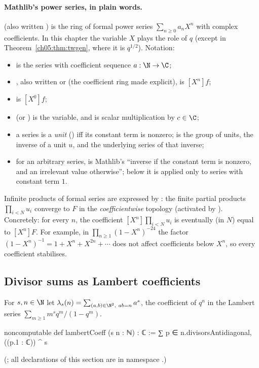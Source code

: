 \paragraph{Mathlib's power series, in plain words.}
 (also written ) is the ring of formal power series $\sum_{n\ge0}a_nX^n$
with complex coefficients. In this chapter the variable $X$ plays the role of $q$ (except in
Theorem~\ref{ch05:thm:twgen}, where it is $q^{1/2}$). Notation:
\begin{itemize}
  \item {} is the series with coefficient sequence $a:\N\to\C$;
  \item {}, also written  or
     (the coefficient ring made explicit), is $[X^n]f$;
  \item {} is $[X^0]f$;
  \item {} (or ) is the variable, and  is scalar
    multiplication by $c\in\C$;
  \item a series is a \emph{unit} () iff its constant term is nonzero;
     is the group of units,  the inverse of a unit $u$, and
     the underlying series of that inverse;
  \item for an arbitrary series,  is Mathlib's ``inverse if the constant term is nonzero,
    and an irrelevant value otherwise''; below it is applied only to series with constant term $1$.
\end{itemize}
Infinite products of formal series are expressed by : the finite partial
products $\prod_{i<N}u_i$ converge to $F$ in the \emph{coefficientwise} topology (activated by
). Concretely: for every $n$, the coefficient
$[X^n]\prod_{i<N}u_i$ is eventually (in $N$) equal to $[X^n]F$. For example, in
$\prod_{n\ge1}(1-X^n)^{-24}$ the factor $(1-X^n)^{-1} = 1 + X^n + X^{2n}+\cdots$ does not affect
coefficients below $X^n$, so every coefficient stabilises.

\subsection{Divisor sums as Lambert coefficients}

\begin{definition}\label{ch05:def:lambert}
For $s,n\in\N$ let $\lambda_s(n) = \sum_{(a,b)\in\N^2,\ ab = n} a^s$, the coefficient of $q^n$ in the
Lambert series $\sum_{m\ge1} m^s q^m/(1-q^m)$.
\end{definition}
\begin{leancode}
noncomputable def lambertCoeff (s n : ℕ) : ℂ :=
  ∑ p ∈ n.divisorsAntidiagonal, ((p.1 : ℂ)) ^ s
\end{leancode}
(; all declarations of this section are in namespace
.)

